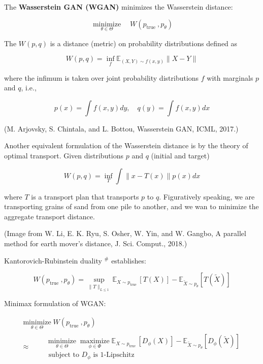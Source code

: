 \documentclass{report}
\begin{document}
\begin{definition}[21.29][WGAN]
    The \textbf{Wasserstein GAN (WGAN)} minimizes the Wasserstein distance:

    $$
    \underset{\theta \in \Theta}{\operatorname{minimize}} \quad W\left(p_{\text {true }}, p_{\theta}\right)
    $$

    The $W(p, q)$ is a distance (metric) on probability distributions defined as

    $$
    W(p, q)=\inf _{f} \mathbb{E}_{(X, Y) \sim f(x, y)}\|X-Y\|
    $$

    where the infimum is taken over joint probability distributions $f$ with marginals $p$ and $q$, i.e.,

    $$
    p(x)=\int f(x, y) d y, \quad q(y)=\int f(x, y) d x
    $$

    (M. Arjovsky, S. Chintala, and L. Bottou, Wasserstein GAN, ICML, 2017.)

    \par\noindent\textcolor{gray}{\hdashrule{\textwidth}{0.4pt}{1pt 2pt}}

    Another equivalent formulation of the Wasserstein distance is by the theory of optimal transport. Given distributions $p$ and $q$ (initial and target)

    $$
    W(p, q)=\inf _{T} \int\|x-T(x)\| p(x) d x
    $$

    where $T$ is a transport plan that transports $p$ to $q$.
    Figuratively speaking, we are transporting grains of sand from one pile to another, and we wan to minimize the aggregate transport distance.

    (Image from W. Li, E. K. Ryu, S. Osher, W. Yin, and W. Gangbo, A parallel method for earth mover’s distance, J. Sci. Comput., 2018.)

    \par\noindent\textcolor{gray}{\hdashrule{\textwidth}{0.4pt}{1pt 2pt}}

    Kantorovich-Rubinstein duality $^{\#}$ establishes:

    $$
    W\left(p_{\text {true }}, p_{\theta}\right)=\sup _{\|T\|_{L \leq 1}} \mathbb{E}_{X \sim p_{\text {true }}}[T(X)]-\mathbb{E}_{\tilde{X} \sim p_{\theta}}[T(\tilde{X})]
    $$

    Minimax formulation of WGAN:

    $$
    \begin{gathered}
    \underset{\theta \in \Theta}{\operatorname{minimize}} W\left(p_{\text {true }}, p_{\theta}\right) \\
    \approx \quad \begin{aligned}
    & \underset{\theta \in \Theta}{\operatorname{minimize}} \underset{\phi \in \Phi}{\operatorname{maximize}} \mathbb{E}_{X \sim p_{\text {true }}}[D_{\phi}(X)]-\mathbb{E}_{\tilde{X} \sim p_{\theta}}[D_{\phi}(\tilde{X})] \\
    & \text { subject to } D_{\phi} \text{ is } 1 \text{-Lipschitz}
    \end{aligned}
    \end{gathered}
    $$


\end{definition}
\end{document}

